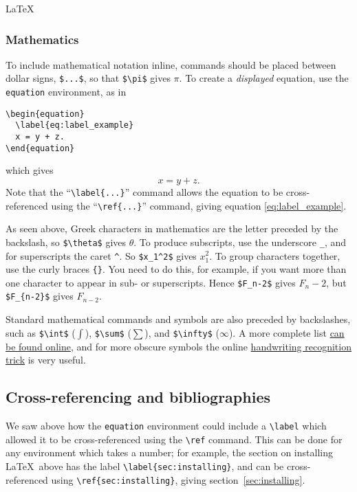 \begin{chapter}{\LaTeX}
\subsubsection{Mathematics}

To include mathematical notation inline, commands should be placed between dollar signs, \verb|$...$|, so that \verb|$\pi$| gives $\pi$. To create a \emph{displayed} equation, use the \texttt{equation} environment, as in
%
\begin{verbatim}
\begin{equation}
  \label{eq:label_example}
  x = y + z.
\end{equation}
\end{verbatim}
%
which gives
%
\begin{equation}
  \label{eq:label_example}
  x = y + z.
\end{equation}
%
Note that the ``\verb|\label{...}|'' command allows the equation to be cross-referenced using the ``\verb|\ref{...}|'' command, giving equation \ref{eq:label_example}.

As seen above, Greek characters in mathematics are the letter preceded by the backslash, so \verb|$\theta$| gives $\theta$. To produce subscripts, use the underscore \verb|_|, and for superscripts the caret \verb|^|. So \verb|$x_1^2$| gives $x_1^2$. To group characters together, use the curly braces \verb|{}|. You need to do this, for example, if you want more than one character to appear in sub- or superscripts. Hence \verb|$F_n-2$| gives $F_n-2$, but \verb|$F_{n-2}$| gives $F_{n-2}$.

Standard mathematical commands and symbols are also preceded by backslashes, such as \verb|$\int$| ($\int$), \verb|$\sum$| ($\sum$), and \verb|$\infty$| ($\infty$). A more complete list \href{https://en.wikibooks.org/wiki/LaTeX/Mathematics}{can be found online}, and for more obscure symbols the online \href{http://detexify.kirelabs.org/classify.html}{handwriting recognition trick} is very useful.

\subsection{Cross-referencing and bibliographies}

We saw above how the \texttt{equation} environment could include a \verb|\label| which allowed it to be cross-referenced using the \verb|\ref| command. This can be done for any environment which takes a number; for example, the section on installing \LaTeX\ above has the label \verb|\label{sec:installing}|, and can be cross-referenced using \verb|\ref{sec:installing}|, giving section~\ref{sec:installing}.


\end{chapter}
